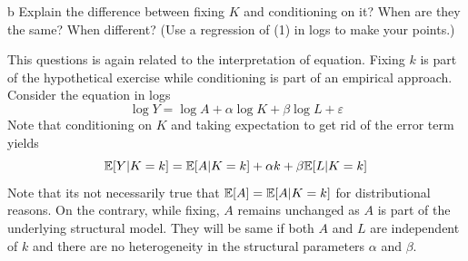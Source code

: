 \documentclass{article}
\begin{document}
\begin{problem}{b}
Explain the difference between fixing $K$ and conditioning on it? When are they the same? When different? (Use a regression of (1) in logs to make your points.)
\end{problem}
\begin{solution}
This questions is again related to the interpretation of equation. Fixing $k$ is part of the hypothetical exercise while conditioning is part of an empirical approach. Consider the equation in logs
\begin{equation*}
    \log Y = \log A + \alpha\log K +\beta\log L + \varepsilon
\end{equation*}
Note that conditioning on $K$ and taking expectation to get rid of the error term yields 
\begin{equation*}
    \mathbb{E}[Y\vert K=k] = \mathbb{E}[A\vert K=k] + \alpha k + \beta\mathbb{E}[L\vert K=k]
\end{equation*}
Note that its not necessarily true that $\mathbb{E}[A]=\mathbb{E}[A\vert K=k]$ for distributional reasons. On the contrary, while fixing, $A$ remains unchanged as $A$ is part of the underlying structural model.  They will be same if both $A$ and $L$ are independent of $k$ and there are no heterogeneity in the structural parameters $\alpha$ and $\beta$.
\end{solution}

\newpage
\end{document}
